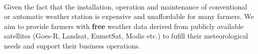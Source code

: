 \paragraph{}
Given the fact that the installation, operation and maintenance of conventional or automatic weather station is expensive and unaffordable
for many farmers. We aim to provide farmers with \textbf {free} weather data derived from publicly available satellites (Goes-R, Landsat, EumetSat, Modis etc.) 
to fufill their meteorological needs and support their business operations.
